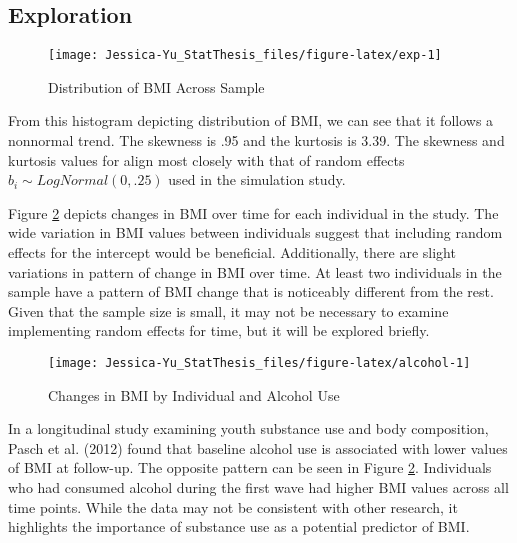 \documentclass[12pt, twoside]{amherstthesis}
\begin{document}
\hypertarget{exploration}{%
\subsection{Exploration}\label{exploration}}
\begin{figure}

{\centering \texttt{[image: Jessica-Yu\_StatThesis\_files/figure-latex/exp-1]} 

}

\caption{Distribution of BMI Across Sample}\label{fig:exp}
\end{figure}
From this histogram depicting distribution of BMI, we can see that it follows a nonnormal trend. The skewness is .95 and the kurtosis is 3.39. The skewness and kurtosis values for align most closely with that of random effects \(b_i \sim\mathit{LogNormal}(0,.25)\) used in the simulation study.

Figure \ref{fig:alcohol} depicts changes in BMI over time for each individual in the study. The wide variation in BMI values between individuals suggest that including random effects for the intercept would be beneficial. Additionally, there are slight variations in pattern of change in BMI over time. At least two individuals in the sample have a pattern of BMI change that is noticeably different from the rest. Given that the sample size is small, it may not be necessary to examine implementing random effects for time, but it will be explored briefly.
\begin{figure}

{\centering \texttt{[image: Jessica-Yu\_StatThesis\_files/figure-latex/alcohol-1]} 

}

\caption{Changes in BMI by Individual and Alcohol Use}\label{fig:alcohol}
\end{figure}
In a longitudinal study examining youth substance use and body composition, Pasch et al. (2012) found that baseline alcohol use is associated with lower values of BMI at follow-up. The opposite pattern can be seen in Figure \ref{fig:alcohol}. Individuals who had consumed alcohol during the first wave had higher BMI values across all time points. While the data may not be consistent with other research, it highlights the importance of substance use as a potential predictor of BMI.
\end{document}
